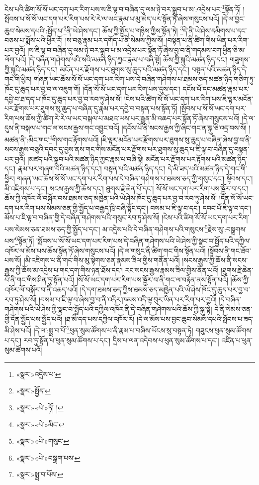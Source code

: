 ངེས་པའི་ཚིག་སོ་སོ་ཡང་དག་པར་རིག་པས་ས་ཇི་ལྟ་བ་བཞིན་དུ་ལམ་ཉེ་བར་སྒྲུབ་པ་མ་:འདྲེས་པར་\footnote{«སྣར་»འདྲེས་པ་}སྟོན་ཏོ། །སྤོབས་པ་སོ་སོ་ཡང་དག་པར་རིག་པས་རེ་རེ་ལ་ཡང་རྣམ་པ་མུ་མེད་པར་སྟོན་ཏོ་ཞེས་གསུངས་པའོ། །དེ་ལ་བྱང་ཆུབ་སེམས་དཔའི་:སྤྱོད་པ་\footnote{«སྣར་»སྤྱོད་}ནི་ཡེ་ཤེས་དང་། ཆོས་ཀྱི་སྤྱོད་པ་གཉིས་ཀྱིས་སྟོན་ཏེ། \footnote{«སྣར་»«པེ་»ཏོ། ། }དེ་ནི་ཡེ་ཤེས་དམིགས་པ་དང་བཅས་པ་སྨོས་པའི་ཕྱིར་རོ། །ས་བཅུ་རྣམ་པར་དགོད་པ་ནི་སེམས་ཀྱིས་སོ། །བསྟན་པ་ནི་ཚིག་གིས་ཡིན་པར་རིག་པར་བྱའོ། །ས་ཇི་ལྟ་བ་བཞིན་དུ་ལམ་ཉེ་བར་སྒྲུབ་པ་མ་འདྲེས་པར་སྟོན་ཏོ་ཞེས་བྱ་བ་ནི་གདམས་ངག་ཕྱིན་ཅི་མ་ལོག་པའོ། །དེ་བཞིན་གཤེགས་པའི་སའི་མཚན་ཉིད་ཀྱང་རྣམ་པ་བཞི་སྟེ། ཆོས་ཀྱི་སྐུའི་མཚན་ཉིད་དང་། གཟུགས་ཀྱི་སྐུའི་མཚན་ཉིད་དང་། མངོན་པར་རྫོགས་པར་ཐུགས་སུ་ཆུད་པའི་མཚན་ཉིད་དང་། བསྟན་པའི་མཚན་ཉིད་དེ་གང་གི་ཕྱིར། གཞན་ཡང་ཆོས་སོ་སོ་ཡང་དག་པར་རིག་པས་དེ་བཞིན་གཤེགས་པ་ཐམས་ཅད་མཚན་ཉིད་གཅིག་ཏུ་ཁོང་དུ་ཆུད་པར་བྱ་བ་ལ་འཇུག་གོ། །དོན་སོ་སོ་ཡང་དག་པར་རིག་པས་དུས་དང་། དངོས་པོ་དང་མཚན་རྣམ་པར་དབྱེ་བ་ཐ་དད་པ་ཁོང་དུ་ཆུད་པར་བྱ་བ་རབ་ཏུ་ཤེས་སོ། །ངེས་པའི་ཚིག་སོ་སོ་ཡང་དག་པར་རིག་པས་ཇི་ལྟར་མངོན་པར་རྫོགས་པར་ཐུགས་སུ་ཆུད་པ་བཞིན་དུ་རྣམ་པར་དབྱེ་བ་བསྟན་པས་སྟོན་ཏོ། །སྤོབས་པ་སོ་སོ་ཡང་དག་པར་རིག་པས་ཆོས་ཀྱི་ཚིག་རེ་རེ་ལ་ཡང་བསྐལ་པ་མཐའ་ཡས་པར་རྒྱུན་མི་འཆད་པར་སྟོན་ཏོ་ཞེས་གསུངས་པའོ། །དེ་ལ་དུས་ནི་བསྐལ་པ་གང་ལ་སངས་རྒྱས་གང་འབྱུང་བའོ། །དངོས་པོ་ནི་སངས་རྒྱས་ཀྱི་ཞིང་གང་ན་སྐུ་ཅི་འདྲ་བས་སོ། །མཚན་ནི་:མིང་གང་\footnote{«སྣར་»«པེ་»མིང་}གིས་གང་རྟོགས་པའོ། །ཇི་ལྟར་མངོན་པར་རྫོགས་པར་ཐུགས་སུ་ཆུད་པ་བཞིན་ཞེས་བྱ་བ་ནི་སངས་རྒྱས་བཅུའི་དབང་དུ་བྱས་ནས་གང་གིས་མངོན་པར་རྫོགས་པར་ཐུགས་སུ་ཆུད་པ་ཇི་ལྟ་བ་བཞིན་དུ་བསྟན་པར་བྱའོ། །མཛད་པའི་སྒྲུབ་པའི་མཚན་ཉིད་ཀྱང་རྣམ་པ་བཞི་སྟེ། མངོན་པར་རྫོགས་པར་རྟོགས་པའི་མཚན་ཉིད་དང་། རྣམ་པར་གཞག་པའི་མཚན་ཉིད་དང་། བསྟན་པའི་མཚན་ཉིད་དང་། དེ་མི་ཟད་པའི་མཚན་ཉིད་དེ་གང་གི་ཕྱིར། གཞན་ཡང་ཆོས་སོ་སོ་ཡང་དག་པར་རིག་པས་དེ་བཞིན་གཤེགས་པ་ཐམས་ཅད་ཀྱི་གསུང་དང་། སྟོབས་དང་། མི་འཇིགས་པ་དང་། སངས་རྒྱས་ཀྱི་ཆོས་དང་། ཐུགས་རྗེ་ཆེན་པོ་དང་། སོ་སོ་ཡང་དག་པར་རིག་པས་སྦྱོར་བ་དང་། ཆོས་ཀྱི་འཁོར་ལོ་བསྐོར་བས་ཐམས་ཅད་མཁྱེན་པའི་ཡེ་ཤེས་ཁོང་དུ་ཆུད་པར་བྱ་བ་རབ་ཏུ་ཤེས་སོ། །དོན་སོ་སོ་ཡང་དག་པར་རིག་པས་སེམས་ཅན་གྱི་སྤྱོད་པ་བརྒྱད་ཁྲི་བཞི་སྟོང་དང་། བསམ་པ་ཇི་ལྟ་བ་དང་། དབང་པོ་ཇི་ལྟ་བ་དང་། མོས་པ་ཇི་ལྟ་བ་བཞིན་གྱི་དེ་བཞིན་གཤེགས་པའི་གསུང་རབ་ཏུ་ཤེས་སོ། །ངེས་པའི་ཚིག་སོ་སོ་ཡང་དག་པར་རིག་པས་སེམས་ཅན་ཐམས་ཅད་ཀྱི་སྤྱོད་པ་དང་། མ་འདྲེས་པའི་དེ་བཞིན་གཤེགས་པའི་གསུངས་\footnote{«སྣར་»«པེ་»གསུང་}རྗེས་སུ་:བསྒྲགས་པས་\footnote{«སྣར་»«པེ་»བསྒྲག་པས་}སྟོན་ཏོ། །སྤོབས་པ་སོ་སོ་ཡང་དག་པར་རིག་པས་དེ་བཞིན་གཤེགས་པའི་ཡེ་ཤེས་ཀྱི་སྣང་བ་སྤྱོད་པའི་དཀྱིལ་འཁོར་ལ་མོས་པས་ཆོས་སྟོན་ཏོ་ཞེས་གསུངས་པའོ། །དེ་ལ་གསུང་ནི་ཚིག་གང་གིས་སྟོན་པའོ། །སྟོབས་ནི་གང་ཐོབ་པས་སོ། །མི་འཇིགས་པ་ནི་གང་གིས་མུ་སྟེགས་ཅན་རྣམས་ཟིལ་གྱིས་གནོན་པའོ། །སངས་རྒྱས་ཀྱི་ཆོས་ནི་སངས་རྒྱས་ཀྱི་ཆོས་མ་འདྲེས་པ་གང་དག་གིས་ཉན་ཐོས་དང་། རང་སངས་རྒྱས་རྣམས་ཟིལ་གྱིས་ནོན་པའོ། །ཐུགས་རྗེ་ཆེན་པོ་ནི་གང་གིས་ཤིན་ཏུ་སྟོན་པའོ། །སོ་སོ་ཡང་དག་པར་རིག་པས་སྦྱོར་བ་ནི་གང་ལ་བརྟེན་ནས་སྟོན་པའོ། །ཆོས་ཀྱི་འཁོར་ལོ་བསྐོར་བ་ནི་འཆད་པའོ། །དེ་དག་ཐམས་ཅད་ཀྱིས་ཐམས་ཅད་མཁྱེན་པའི་ཡེ་ཤེས་ཁོང་དུ་ཆུད་པར་བྱ་བ་རབ་ཏུ་ཤེས་སོ། །བསམ་པ་ཇི་ལྟ་བ་ཞེས་བྱ་བ་ནི་འདིར་ཁམས་འདི་ལྟ་བུར་ཡིན་པར་རིག་པར་བྱའོ། །དེ་བཞིན་གཤེགས་པའི་ཡེ་ཤེས་ཀྱི་སྣང་བ་སྤྱོད་པའི་དཀྱིལ་འཁོར་ནི་དེ་བཞིན་གཤེགས་པའི་ཆོས་ཀྱི་སྐུ་སྟེ། དེ་ནི་སེམས་ཅན་གྱི་དོན་སྤྱོད་པས་སྤྱོད་པའོ། །ཐ་མི་དད་པས་དཀྱིལ་འཁོར་རོ། །དེ་ལ་མོས་པས་བྱང་ཆུབ་སེམས་དཔའི་སྤོབས་པ་ཟད་མི་ཤེས་པའོ། །དེ་ལ་:སྨྲ་བ་པོ་\footnote{«སྣར་»སྨྲ་བ་པོས་}ཕུན་སུམ་ཚོགས་པ་ནི་རྣམ་པ་བཞིས་ཡོངས་སུ་བསྟན་ཏེ། གཟུངས་ཕུན་སུམ་ཚོགས་པ་དང་། རབ་ཏུ་སྟོན་པ་ཕུན་སུམ་ཚོགས་པ་དང་། དྲིས་པ་ལན་འདེབས་པ་ཕུན་སུམ་ཚོགས་པ་དང་། འཛིན་པ་ཕུན་སུམ་ཚོགས་པའོ། 
